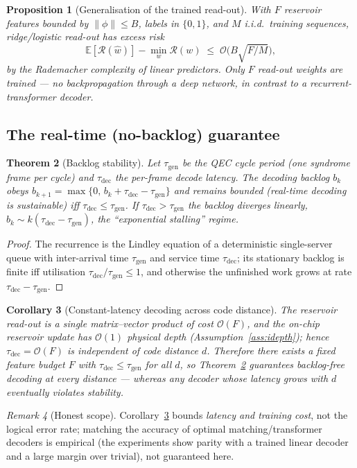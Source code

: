 \documentclass[11pt]{article}
\theoremstyle{plain}
\newtheorem{theorem}{Theorem}[section]
\newtheorem{proposition}[theorem]{Proposition}
\newtheorem{corollary}[theorem]{Corollary}
\theoremstyle{definition}
\theoremstyle{remark}
\newtheorem{remark}[theorem]{Remark}
\newcommand{\E}{\mathbb{E}}
\newcommand{\bigO}{\mathcal{O}}
\begin{document}
\begin{proposition}[Generalisation of the trained read-out]\label{prop:t4gen}
With $F$ reservoir features bounded by $\|\phi\|\le B$, labels in $\{0,1\}$, and $M$ i.i.d.\ training sequences, ridge/logistic read-out has excess risk
\begin{equation}
\E[\mathcal R(\widehat w)]-\min_w \mathcal R(w)\;\le\;\bigO\!\Big(B\sqrt{F/M}\Big),
\end{equation}
by the Rademacher complexity of linear predictors. Only $F$ read-out weights are trained --- no backpropagation through a deep network, in contrast to a recurrent-transformer decoder.
\end{proposition}

\subsection{The real-time (no-backlog) guarantee}
\begin{theorem}[Backlog stability]\label{thm:backlog}
Let $\tau_{\mathrm{gen}}$ be the QEC cycle period (one syndrome frame per cycle) and $\tau_{\mathrm{dec}}$ the per-frame decode latency. The decoding backlog $b_k$ obeys $b_{k+1}=\max\{0,\,b_k+\tau_{\mathrm{dec}}-\tau_{\mathrm{gen}}\}$ and remains bounded (real-time decoding is sustainable) \emph{iff} $\tau_{\mathrm{dec}}\le\tau_{\mathrm{gen}}$. If $\tau_{\mathrm{dec}}>\tau_{\mathrm{gen}}$ the backlog diverges linearly, $b_k\sim k(\tau_{\mathrm{dec}}-\tau_{\mathrm{gen}})$, the ``exponential stalling'' regime.
\end{theorem}
\begin{proof}
The recurrence is the Lindley equation of a deterministic single-server queue with inter-arrival time $\tau_{\mathrm{gen}}$ and service time $\tau_{\mathrm{dec}}$; its stationary backlog is finite iff utilisation $\tau_{\mathrm{dec}}/\tau_{\mathrm{gen}}\le 1$, and otherwise the unfinished work grows at rate $\tau_{\mathrm{dec}}-\tau_{\mathrm{gen}}$.\end{proof}

\begin{corollary}[Constant-latency decoding across code distance]\label{cor:t4}
The reservoir read-out is a single matrix--vector product of cost $\bigO(F)$, and the on-chip reservoir update has $\bigO(1)$ physical depth (Assumption~\ref{ass:idepth}); hence $\tau_{\mathrm{dec}}=\bigO(F)$ is \emph{independent of code distance $d$}. Therefore there exists a fixed feature budget $F$ with $\tau_{\mathrm{dec}}\le\tau_{\mathrm{gen}}$ for all $d$, so Theorem~\ref{thm:backlog} guarantees backlog-free decoding at every distance --- whereas any decoder whose latency grows with $d$ eventually violates stability.
\end{corollary}
\begin{remark}[Honest scope]
Corollary~\ref{cor:t4} bounds \emph{latency and training cost}, not the logical error rate; matching the accuracy of optimal matching/transformer decoders is empirical (the experiments show parity with a trained linear decoder and a large margin over trivial), not guaranteed here.
\end{remark}
\end{document}
